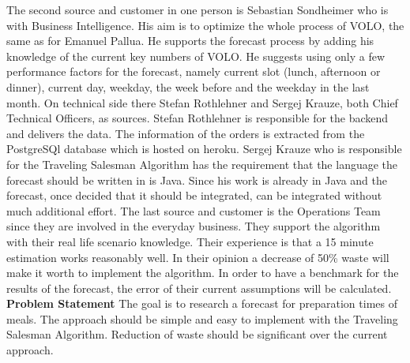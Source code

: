 The second source and customer in one person is Sebastian Sondheimer who is with Business Intelligence. His aim is to optimize the whole process of VOLO, the same as for Emanuel Pallua. He supports the forecast process by adding his knowledge of the current key numbers of VOLO. He suggests using only a few performance factors for the forecast, namely current slot (lunch, afternoon or dinner), current day, weekday, the week before and the weekday in the last month.\newline
On technical side there Stefan Rothlehner and Sergej Krauze, both Chief Technical Officers, as sources. Stefan Rothlehner is responsible for the backend and delivers the data. The information of the orders is extracted from the PostgreSQl database which is hosted on heroku. Sergej Krauze who is responsible for the Traveling Salesman Algorithm has the requirement that the language the forecast should be written in is Java. Since his work is already in Java and the forecast, once decided that it should be integrated, can be integrated without much additional effort.\newline
The last source and customer is the Operations Team since they are involved in the everyday business. They support the algorithm with their real life scenario knowledge. Their experience is that a 15 minute estimation works reasonably well. In their opinion a decrease of 50\% waste will make it worth to implement the algorithm. In order to have a benchmark for the results of the forecast, the error of their current assumptions will be calculated.
\newline\newline\textbf{Problem Statement}\newline
The goal is to research a forecast for preparation times of meals. The approach should be simple and easy to implement with the Traveling Salesman Algorithm. Reduction of waste should be significant over the current approach.
